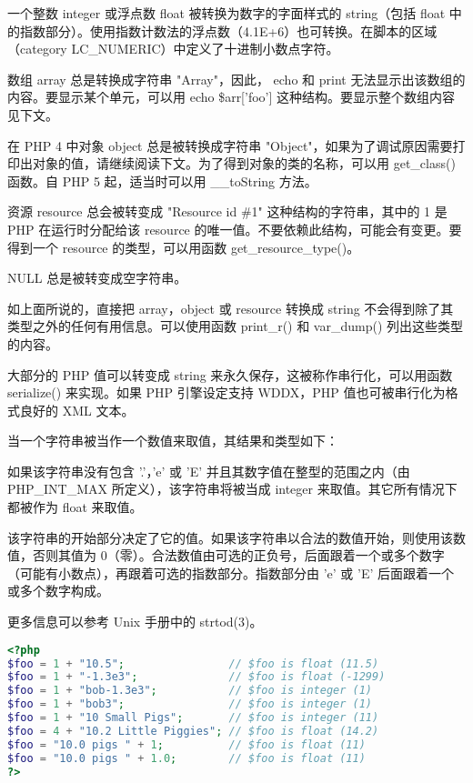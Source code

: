 一个整数 integer 或浮点数 float 被转换为数字的字面样式的 string（包括 float 中的指数部分）。使用指数计数法的浮点数（4.1E+6）也可转换。在脚本的区域（category LC\_NUMERIC）中定义了十进制小数点字符。

数组 array 总是转换成字符串 "Array"，因此， echo 和 print 无法显示出该数组的内容。要显示某个单元，可以用 echo \$arr['foo'] 这种结构。要显示整个数组内容见下文。

在 PHP 4 中对象 object 总是被转换成字符串 "Object"，如果为了调试原因需要打印出对象的值，请继续阅读下文。为了得到对象的类的名称，可以用 get\_class() 函数。自 PHP 5 起，适当时可以用 \_\_toString 方法。

资源 resource 总会被转变成 "Resource id \#1" 这种结构的字符串，其中的 1 是 PHP 在运行时分配给该 resource 的唯一值。不要依赖此结构，可能会有变更。要得到一个 resource 的类型，可以用函数 get\_resource\_type()。

NULL 总是被转变成空字符串。

如上面所说的，直接把 array，object 或 resource 转换成 string 不会得到除了其类型之外的任何有用信息。可以使用函数 print\_r() 和 var\_dump() 列出这些类型的内容。

大部分的 PHP 值可以转变成 string 来永久保存，这被称作串行化，可以用函数 serialize() 来实现。如果 PHP 引擎设定支持 WDDX，PHP 值也可被串行化为格式良好的 XML 文本。

当一个字符串被当作一个数值来取值，其结果和类型如下：

如果该字符串没有包含 '.'，'e' 或 'E' 并且其数字值在整型的范围之内（由 PHP\_INT\_MAX 所定义），该字符串将被当成 integer 来取值。其它所有情况下都被作为 float 来取值。

该字符串的开始部分决定了它的值。如果该字符串以合法的数值开始，则使用该数值，否则其值为 0（零）。合法数值由可选的正负号，后面跟着一个或多个数字（可能有小数点），再跟着可选的指数部分。指数部分由 'e' 或 'E' 后面跟着一个或多个数字构成。

更多信息可以参考 Unix 手册中的 strtod(3)。



\begin{lstlisting}[language=PHP]
<?php
$foo = 1 + "10.5";                // $foo is float (11.5)
$foo = 1 + "-1.3e3";              // $foo is float (-1299)
$foo = 1 + "bob-1.3e3";           // $foo is integer (1)
$foo = 1 + "bob3";                // $foo is integer (1)
$foo = 1 + "10 Small Pigs";       // $foo is integer (11)
$foo = 4 + "10.2 Little Piggies"; // $foo is float (14.2)
$foo = "10.0 pigs " + 1;          // $foo is float (11)
$foo = "10.0 pigs " + 1.0;        // $foo is float (11)     
?>
\end{lstlisting}

